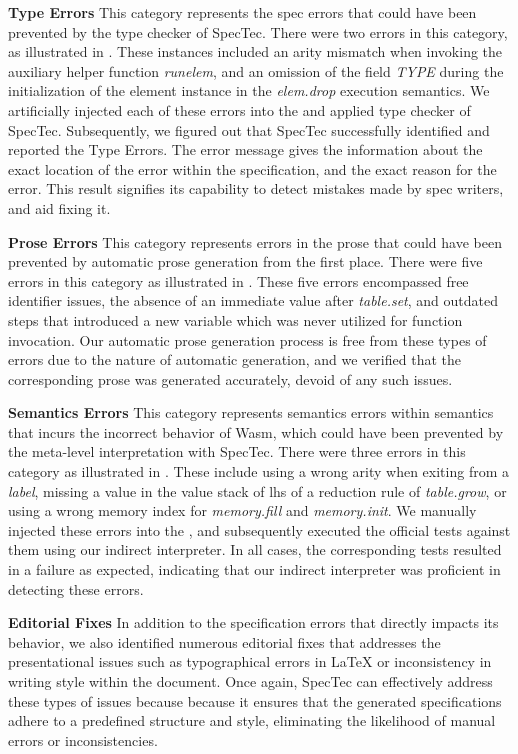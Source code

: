 \textbf{Type Errors}
This category represents the spec errors that could have been prevented by the
type checker of SpecTec. There were two errors in this category, as illustrated
in . These instances included an arity mismatch when invoking
the auxiliary helper function \textit{runelem}, and an omission of the field
\textit{TYPE} during the initialization of the element instance in the
\textit{elem.drop} execution semantics. We artificially injected each of these
errors into the \specdsl and applied type checker of SpecTec.  Subsequently, we
figured out that SpecTec successfully identified and reported the Type Errors.
The error message gives the information about the exact location of the error
within the specification, and the exact reason for the error.  This result
signifies its capability to detect mistakes made by spec writers, and aid
fixing it.

\textbf{Prose Errors}
This category represents errors in the prose that could have been prevented by
automatic prose generation from the first place. There were five errors in this
category as illustrated in . These five errors encompassed
free identifier issues, the absence of an immediate value after
\textit{table.set}, and outdated steps that introduced a new variable which was
never utilized for function invocation. Our automatic prose generation process
is free from these types of errors due to the nature of automatic generation,
and we verified that the corresponding prose was generated accurately, devoid
of any such issues.

\textbf{Semantics Errors}
This category represents semantics errors within semantics that incurs the
incorrect behavior of Wasm, which could have been prevented by the meta-level
interpretation with SpecTec.  There were three errors in this category as
illustrated in . These include using a wrong arity when
exiting from a \textit{label}, missing a value in the value stack of lhs of a
reduction rule of \textit{table.grow}, or using a wrong memory index for
\textit{memory.fill} and \textit{memory.init}.  We manually injected these
errors into the \specdsl, and subsequently executed the official tests against them
using our indirect interpreter. In all cases, the corresponding tests resulted
in a failure as expected, indicating that our indirect interpreter was proficient
in detecting these errors.

\textbf{Editorial Fixes}
In addition to the specification errors that directly impacts its behavior, we
also identified numerous editorial fixes that addresses the presentational
issues such as typographical errors in LaTeX or inconsistency in writing style
within the document. Once again, SpecTec can effectively address these types of
issues because because it ensures that the generated specifications adhere to a
predefined structure and style, eliminating the likelihood of manual errors or
inconsistencies.

